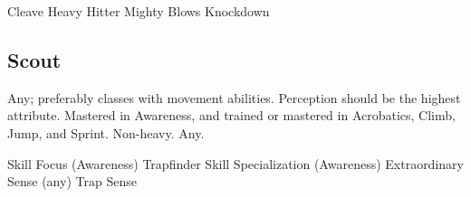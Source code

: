         \begin{enumerate}[leftmargin=3em]
            \itempath Cleave
            \itempath Heavy Hitter
            \itempath Mighty Blows
            \itempath Knockdown
        \end{enumerate}

    \subsection{Scout}
         Any; preferably classes with movement abilities.
         Perception should be the highest attribute.
         Mastered in Awareness, and trained or mastered in Acrobatics, Climb, Jump, and Sprint.
         Non-heavy.
         Any.

        \begin{enumerate}[leftmargin=3em]
            \itempath Skill Focus (Awareness)
            \itempath Trapfinder
            \itempath Skill Specialization (Awareness)
            \itempath Extraordinary Sense (any)
            \itempath Trap Sense
        \end{enumerate}
